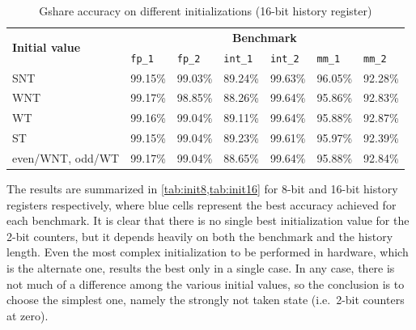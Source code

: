 \begin{table}[hbt]
  \centering
  \begin{tabular}{lllllll}
    \toprule
    \multirow{2}{*}{\textbf{Initial value}} & \multicolumn{6}{c}{\textbf{Benchmark}}                             \\
    \cmidrule{2-7}
                                   & \texttt{fp\_1}               & \texttt{fp\_2}                & \texttt{int\_1}               & \texttt{int\_2}               & \texttt{mm\_1}                & \texttt{mm\_2}                \\
    \midrule
    SNT                            & 99.15\%                      & 99.03\%                       & \cellcolor{cell_blue}89.24\% & 99.63\%                        & \cellcolor{cell_blue}96.05\%  & 92.28\%                       \\
    WNT                            & \cellcolor{cell_blue}99.17\% & 98.85\%                       & 88.26\%                      & \cellcolor{cell_blue}99.64\%   & 95.86\%                       & 92.83\%                       \\
    WT                             & 99.16\%                      & \cellcolor{cell_blue}99.04\%  & 89.11\%                      & 99.64\%                        & 95.88\%                       & \cellcolor{cell_blue}92.87\%  \\
    ST                             & 99.15\%                      & 99.04\%                       & 89.23\%                      & 99.61\%                        & 95.97\%                       & 92.39\%                       \\
    even/WNT, odd/WT               & 99.17\%                      & 99.04\%                       & 88.65\%                      & 99.64\%                        & 95.88\%                       & 92.84\%                       \\ 
    \bottomrule
  \end{tabular}
  \caption{Gshare accuracy on different initializations (16-bit history register)}
  \label{tab:init16}
\end{table}

The results are summarized in \cref{tab:init8,tab:init16} for 8-bit and 16-bit history registers respectively, where blue cells represent the best accuracy achieved for each benchmark. It is clear that there is no single best initialization value for the 2-bit counters, but it depends heavily on both the benchmark and the history length. Even the most complex initialization to be performed in hardware, which is the alternate one, results the best only in a single case. In any case, there is not much of a difference among the various initial values, so the conclusion is to choose the simplest one, namely the strongly not taken state (i.e.\ 2-bit counters at zero).

